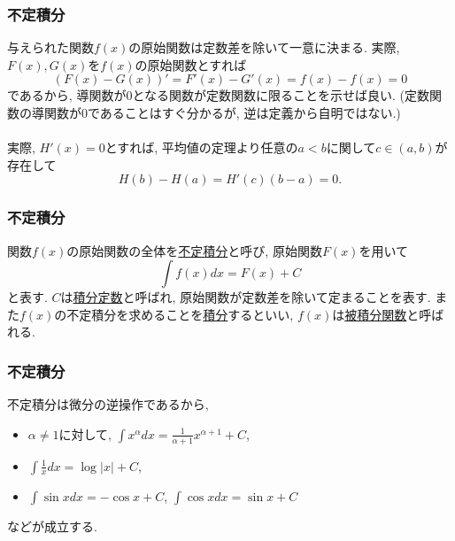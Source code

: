 


\begin{frame}
\frametitle{不定積分}

与えられた関数$f(x)$の原始関数は定数差を除いて一意に決まる. 
実際, $F(x), G(x)$を$f(x)$の原始関数とすれば
$$
(F(x)-G(x))'=F'(x)-G'(x)=f(x)-f(x)=0
$$
であるから, 導関数が$0$となる関数が定数関数に限ることを示せば良い. 
(定数関数の導関数が$0$であることはすぐ分かるが, 逆は定義から自明ではない.)\\
\ \\

実際, $H'(x)=0$とすれば, 平均値の定理より任意の$a<b$に関して$c \in (a,b)$が存在して
$$
H(b)-H(a)=H'(c)(b-a)=0. 
$$

\end{frame}






\begin{frame}
\frametitle{不定積分}


\begin{Def}
関数$f(x)$の原始関数の全体を\underline{不定積分}と呼び, 原始関数$F(x)$を用いて   
$$
\int f(x)dx = F(x)+C
$$
と表す. $C$は\underline{積分定数}と呼ばれ, 原始関数が定数差を除いて定まることを表す. 
また$f(x)$の不定積分を求めることを\underline{積分}するといい, $f(x)$は\underline{被積分関数}と呼ばれる.  
\end{Def}
 


\end{frame}








\begin{frame}
\frametitle{不定積分}

不定積分は微分の逆操作であるから, 
\begin{itemize}
\item $\alpha \ne 1$に対して, $\displaystyle \int x^\alpha dx = \frac{1}{\alpha+1}x^{\alpha+1}+C$,
\item $\displaystyle \int \frac{1}{x}dx = \log |x|+C$,
\item $\displaystyle \int \sin x dx = -\cos x+C$, $\displaystyle \int \cos x dx = \sin x+C$
\end{itemize}
などが成立する. 

\end{frame}




